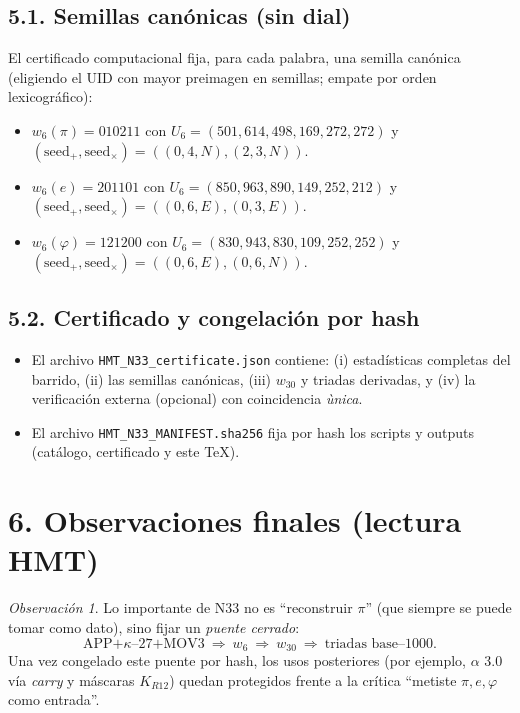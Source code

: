 \documentclass[11pt,a4paper]{article}
\theoremstyle{plain}
\theoremstyle{definition}
\theoremstyle{remark}
\newtheorem{obs}{Observaci\'on}
\begin{document}
\subsection*{5.1. Semillas can\'onicas (sin dial)}
El certificado computacional fija, para cada palabra, una semilla can\'onica
(eligiendo el UID con mayor preimagen en semillas; empate por orden lexicogr\'afico):
\begin{itemize}
\item $w_6(\pi)=010211$ con $U_6=(501,614,498,169,272,272)$ y
      $(\mathrm{seed}_+,\mathrm{seed}_{\times})=((0,4,N),(2,3,N))$.
\item $w_6(e)=201101$ con $U_6=(850,963,890,149,252,212)$ y
      $(\mathrm{seed}_+,\mathrm{seed}_{\times})=((0,6,E),(0,3,E))$.
\item $w_6(\varphi)=121200$ con $U_6=(830,943,830,109,252,252)$ y
      $(\mathrm{seed}_+,\mathrm{seed}_{\times})=((0,6,E),(0,6,N))$.
\end{itemize}

\subsection*{5.2. Certificado y congelaci\'on por hash}
\begin{itemize}
\item El archivo \texttt{HMT\_N33\_certificate.json} contiene:
  (i) estad\'isticas completas del barrido, (ii) las semillas can\'onicas,
  (iii) $w_{30}$ y triadas derivadas, y (iv) la verificaci\'on externa (opcional) con coincidencia \emph{\`unica}.
\item El archivo \texttt{HMT\_N33\_MANIFEST.sha256} fija por hash los scripts y outputs
  (cat\'alogo, certificado y este \TeX).
\end{itemize}

\section*{6. Observaciones finales (lectura HMT)}
\begin{obs}
Lo importante de N33 no es ``reconstruir $\pi$'' (que siempre se puede tomar como dato),
sino fijar un \emph{puente cerrado}:
\[
\text{APP+$\kappa$--27+MOV3}\ \Longrightarrow\ w_6\ \Longrightarrow\ w_{30}\ \Longrightarrow\ \text{triadas base--1000}.
\]
Una vez congelado este puente por hash, los usos posteriores (por ejemplo, $\alpha$ 3.0
v\'ia \emph{carry} y m\'ascaras $K_{R12}$) quedan protegidos frente a la cr\'itica
``metiste $\pi,e,\varphi$ como entrada''.
\end{obs}
\end{document}
